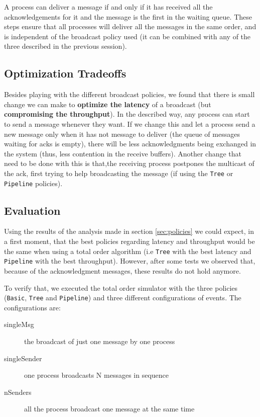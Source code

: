 \documentclass[a4paper, 11pt]{article}
\begin{document}
	A process can deliver a message if and only if it has received all the acknowledgements for it and the message is the first in the waiting queue. These steps ensure that all processes will deliver all the messages in the same order, and is independent of the broadcast policy used (it can be combined with any of the three described in the previous session).
	
\subsection{Optimization Tradeoffs}
	Besides playing with the different broadcast policies, we found that there is small change we can make to \textbf{optimize the latency} of a broadcast (but \textbf{compromising the throughput}). In the described way, any process can start to send a message whenever they want. If we change this and let a process send a new message only when it has not message to deliver (the queue of messages waiting for acks is empty), there will be less acknowledgments being exchanged in the system (thus, less contention in the receive buffers). Another change that need to be done with this is that,the receiving process postpones the multicast of the ack, first trying to help broadcasting the message (if using the \texttt{Tree} or \texttt{Pipeline} policies).

\subsection{Evaluation}
	Using the results of the analysis made in section \ref{sec:policies} we could expect, in a first moment, that the best policies regarding latency and throughput would be the same when using a total order algorithm (i.e \texttt{Tree} with the best latency and \texttt{Pipeline} with the best throughput). However, after some tests we observed that, because of the acknowledgment messages, these results do not hold anymore.
	
	To verify that, we executed the total order simulator with the three policies (\texttt{Basic}, \texttt{Tree} and \texttt{Pipeline}) and three different configurations of events. The configurations are:
	
\begin{description}
	\item[singleMsg] the broadcast of just one message by one process
	\item[singleSender] one process broadcasts N messages in sequence
	\item[nSenders] all the process broadcast one message at the same time
\end{description}
\end{document}
